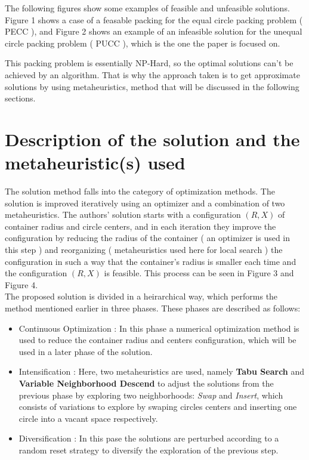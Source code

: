 \documentclass{article}
\begin{document}
The following figures show some examples of feasible and unfeasible solutions. Figure 1 shows a case of a feasable packing for the equal circle packing problem ( PECC ), and Figure 2 shows an example of an infeasible solution for the unequal circle packing problem ( PUCC ), which is the one the paper is focused on.



This packing problem is essentially NP-Hard, so the optimal solutions can't be achieved by an algorithm. That is why the approach taken is to get approximate solutions by using metaheuristics, method that will be discussed in the following sections.\\



\section{Description of the solution and the metaheuristic(s) used}\label{sec:solution}%
The solution method falls into the category of optimization methods. The solution is improved iteratively using an optimizer and a combination of two metaheuristics. The authors' solution starts with a configuration $(R,X)$ of container radius and circle centers, and in each iteration they improve the configuration by reducing the radius of the container ( an optimizer is used in this step ) and reorganizing ( metaheuristics used here for local search ) the configuration in such a way that the container's radius is smaller each time and the configuration $(R,X)$ is feasible. This process can be seen in Figure 3 and Figure 4.\\



The proposed solution is divided in a heirarchical way, which performs the method mentioned earlier in three phases. These phases are described as follows:

\begin{itemize}
\item Continuous Optimization : In this phase a numerical optimization method is used to reduce the container radius and centers configuration, which will be used in a later phase of the solution.
\item Intensification : Here, two metaheuristics are used, namely \textbf{Tabu Search} and \textbf{Variable Neighborhood Descend} to adjust the solutions from the previous phase by exploring two neighborhoods: \textit{Swap} and \textit{Insert}, which consists of variations to explore by swaping circles centers and inserting one circle into a vacant space respectively.
\item Diversification : In this pase the solutions are perturbed according to a random reset strategy to diversify the exploration of the previous step.
\end{itemize}
\end{document}
